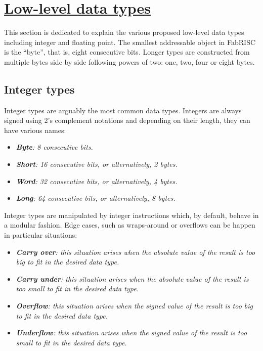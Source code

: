 \section[Low-level data types]{\LARGE\underline{Low-level data types}}

    \vspace{10pt}

    This section is dedicated to explain the various proposed low-level data types including integer and floating point. The smallest addressable object in FabRISC is the ``byte'', that is, eight consecutive bits. Longer types are constructed from multiple bytes side by side following powers of two: one, two, four or eight bytes.

    \subsection{Integer types}

        Integer types are arguably the most common data types. Integers are always signed using 2's complement notations and depending on their length, they can have various names:

        \begin{itemize}

            \item \textit{\textbf{Byte}: 8 consecutive bits.}
            \item \textit{\textbf{Short}: 16 consecutive bits, or alternatively, 2 bytes.}
            \item \textit{\textbf{Word}: 32 consecutive bits, or alternatively, 4 bytes.}
            \item \textit{\textbf{Long}: 64 consecutive bits, or alternatively, 8 bytes.}

        \end{itemize}

        Integer types are manipulated by integer instructions which, by default, behave in a modular fashion. Edge cases, such as wraps-around or overflows can be happen in particular situations:

        \begin{itemize}

            \item \textit{\textbf{Carry over}: this situation arises when the absolute value of the result is too big to fit in the desired data type.}

            \item \textit{\textbf{Carry under}: this situation arises when the absolute value of the result is too small to fit in the desired data type.}

            \item \textit{\textbf{Overflow}: this situation arises when the signed value of the result is too big to fit in the desired data type.}

            \item \textit{\textbf{Underflow}: this situation arises when the signed value of the result is too small to fit in the desired data type.}

        \end{itemize}

